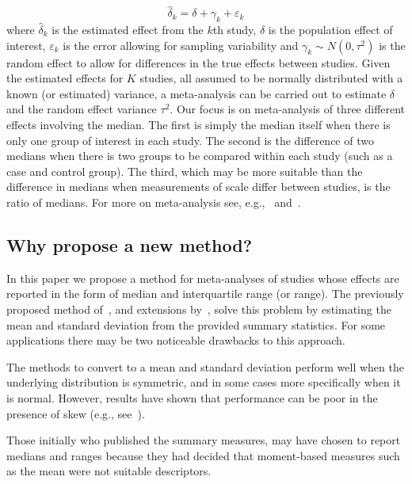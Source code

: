 \documentclass{article}
\begin{document}
\begin{equation}
\widehat{\delta}_k=\delta + \gamma_k + \varepsilon_k
\end{equation}
where $\widehat{\delta}_k$ is the estimated effect from the $k$th study, $\delta$ is the population effect of interest, $\varepsilon_k$ is the error allowing for sampling variability and $\gamma_k\sim N(0,\tau^2)$ is the random effect to allow for differences in the true effects between studies.  Given the estimated effects for $K$ studies, all assumed to be normally distributed with a known (or estimated) variance, a meta-analysis can be carried out to estimate $\delta$ and the random effect variance $\tau^2$.  Our focus is on meta-analysis of three different effects involving the median.  The first is simply the median itself when there is only one group of interest in each study.  The second is the difference of two medians when there is two groups to be compared within each study (such as a case and control group).  The third, which may be more suitable than the difference in medians when measurements of scale differ between studies, is the ratio of medians.   For more on meta-analysis see, e.g.,~\cite{borenstein2008introduction} and~\cite{kulinskaya2008meta}.

\subsection{Why propose a new method?}

In this paper we propose a method for meta-analyses of studies whose effects are reported in the form of median and interquartile range (or range). The previously proposed method of~\cite{hozoEstimatingMeanVariance2005}, and extensions by~\cite{blandEstimatingMeanStandard2014, wanEstimatingSampleMean2014}, solve this problem by estimating the mean and standard deviation from the provided summary statistics. For some applications there may be two noticeable drawbacks to this approach.

\begin{disadv}\label{disadv:1}
The methods to convert to a mean and standard deviation perform well when the underlying distribution is symmetric, and in some cases more specifically when it is normal.  However, results have shown that performance can be poor in the presence of skew (e.g., see~\cite{shi2018estimate}).
\end{disadv}

\begin{disadv}\label{disadv:2}
Those initially who published the summary measures, may have chosen to report medians and ranges because they had decided that moment-based measures such as the mean were not suitable descriptors.
\end{disadv}
\end{document}
